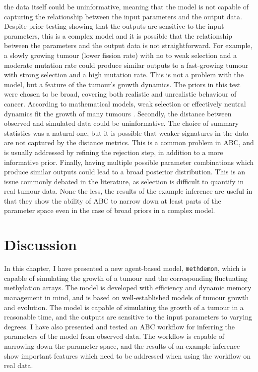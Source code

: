 the data itself could be uninformative, meaning that the model is not capable
of capturing the relationship between the input parameters and the output data.
Despite prior testing showing that the outputs are sensitive to the input
parameters, this is a complex model and it is possible that the relationship
between the parameters and the output data is not straightforward. For example,
a slowly growing tumour (lower fission rate) with no to weak selection and a
moderate mutation rate could produce similar outputs to a fast-growing tumour
with strong selection and a high mutation rate. This is not a problem with the
model, but a feature of the tumour's growth dynamics. The priors in this test
were chosen to be broad, covering both realistic and unrealistic behaviour of
cancer. According to mathematical models, weak selection or effectively neutral
dynamics fit the growth of many tumours \cite{williams_identification_2016}.
Secondly, the distance between observed and simulated data could be
uninformative. The choice of summary statistics was a natural one, but it is
possible that weaker signatures in the data are not captured by the distance
metrics. This is a common problem in ABC, and is usually addressed by refining
the rejection step, in addition to a more informative prior. Finally, having
multiple possible parameter combinations which produce similar outputs could
lead to a broad posterior distribution. This is an issue commonly debated in
the literature, as selection is difficult to quantify in real tumour data. None
the less, the results of the example inference are useful in that they show the
ability of ABC to narrow down at least parts of the parameter space even in the
case of broad priors in a complex model.

\section{Discussion}
In this chapter, I have presented a new agent-based model, \texttt{methdemon},
which is capable of simulating the growth of a tumour and the corresponding
fluctuating methylation arrays. The model is developed with efficiency and
dynamic memory management in mind, and is based on well-established models of
tumour growth and evolution. The model is capable of simulating the growth of a
tumour in a reasonable time, and the outputs are sensitive to the input
parameters to varying degrees. I have also presented and tested an ABC workflow
for inferring the parameters of the model from observed data. The workflow is
capable of narrowing down the parameter space, and the results of an example
inference show important features which need to be addressed when using the
workflow on real data.

